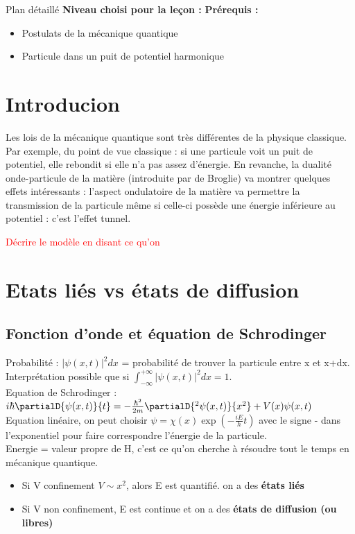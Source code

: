 \begin{reportBlock}{Plan détaillé}
  \textbf{Niveau choisi pour la leçon :} 
  \newline
  \textbf{Prérequis : }
  \begin{itemize}
      \item Postulats de la mécanique quantique
      \item Particule dans un puit de potentiel harmonique
  \end{itemize}

\section*{Introducion}
Les lois de la mécanique quantique sont très différentes de la physique classique. Par exemple, du point de vue classique : si une particule voit un puit de potentiel, elle rebondit si elle n'a pas assez d'énergie. En revanche, la dualité onde-particule de la matière (introduite par de Broglie) va montrer quelques effets intéressants : l'aspect ondulatoire de la matière va permettre la transmission de la particule même si celle-ci possède une énergie inférieure au potentiel : c'est l'effet tunnel.

\textcolor{red}{Décrire le modèle en disant ce qu'on}
\section{Etats liés vs états de diffusion}
\subsection{Fonction d'onde et équation de Schrodinger}

Probabilité : $|\psi(x,t)|^2dx$ = probabilité de trouver la particule entre x et x+dx. Interprétation possible que si $\int_{-\infty}^{+\infty}|\psi(x,t)|^2dx=1$.\\

Equation de Schrodinger : $i\hbar\partialD{\psi(x,t)}{t}=-\frac{\hbar^2}{2m}\partialD{^2\psi(x,t)}{x^2}+V(x)\psi(x,t)$\\

Equation linéaire, on peut choisir $\psi = \chi(x)\exp\left(-\frac{iE}{h}t\right)$ avec le signe - dans l'exponentiel pour faire correspondre l'énergie de la particule.\\

Energie = valeur propre de H, c'est ce qu'on cherche à résoudre tout le temps en mécanique quantique. 
\begin{itemize}
    \item Si V confinement $V\sim x^2$, alors E est quantifié. on a des \textbf{états liés}
    \item Si V non confinement, E est continue et on a des \textbf{états de diffusion (ou libres)}
\end{itemize}


\end{reportBlock}
